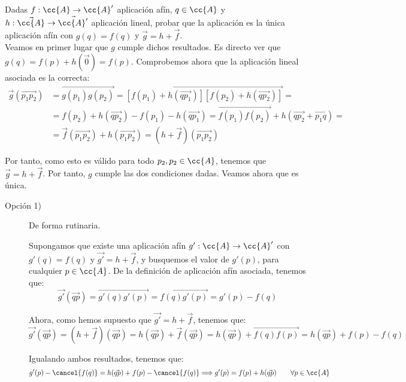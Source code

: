\begin{ejercicio}
    Dadas $f : \cc{A} \to \cc{A}'$ aplicación afín, $q \in \cc{A}$ y $h : \vec{\cc{A}} \to \vec{\cc{A}'}$ aplicación lineal, probar que la aplicación
    es la única aplicación afín con $g(q) = f(q)$ y $\vec{g} = h + \vec{f}$.\\

    Veamos en primer lugar que $g$ cumple dichos resultados. Es directo ver que $g(q)=f(p)+h(\vec{0}) = f(p)$. Comprobemos ahora que la aplicación lineal asociada es la correcta:
    \begin{equation*}\begin{split}
        \vec{g}(\vec{p_1p_2}) &= \vec{g(p_1)g(p_2)} = \vec{[f(p_1) + h(\vec{qp_1})][f(p_2) + h(\vec{qp_2})]} =\\&= f(p_2) + h(\vec{qp_2}) - f(p_1) - h(\vec{qp_1}) = \vec{f(p_1)f(p_2)} + h(\vec{qp_2}+\vec{p_1q}) =\\&= \vec{f}(\vec{p_1p_2}) + h(\vec{p_1p_2}) = (h+\vec{f})(\vec{p_1p_2})
    \end{split}\end{equation*}
    
    Por tanto, como esto es válido para todo $p_2,p_2\in \cc{A}$, tenemos que $\vec{g} = h + \vec{f}$. Por tanto, $g$ cumple las dos condiciones dadas. Veamos ahora que es única. 
    \begin{description}
        \item[Opción 1)] De forma rutinaria.

        Supongamos que existe una aplicación afín $g':\cc{A}\to \cc{A}'$ con $g'(q)=f(q)$ y $\vec{g'}=h+\vec{f}$, y busquemos el valor de $g'(p)$, para cualquier $p\in \cc{A}$. De la definición de aplicación afín asociada, tenemos que:
        \begin{equation*}
            \vec{g'}(\vec{qp}) = \vec{g'(q)g'(p)} = \vec{f(q)g'(p)} = g'(p) - f(q)
        \end{equation*}
    
        Ahora, como hemos supuesto que $\vec{g'}=h+\vec{f}$, tenemos que:
        \begin{equation*}
            \vec{g'}(\vec{qp}) = (h+\vec{f})(\vec{qp}) = h(\vec{qp}) + \vec{f}(\vec{qp}) = h(\vec{qp}) + \vec{f(q)f(p)} = h(\vec{qp}) + f(p) - f(q)
        \end{equation*}
    
        Igualando ambos resultados, tenemos que:
        \begin{equation*}
            g'(p) - \cancel{f(q)}=h(\vec{qp}) + f(p) - \cancel{f(q)} \Longrightarrow g'(p)=f(p)+h(\vec{qp}) \qquad \forall p\in \cc{A}
        \end{equation*}
    

\end{description}
\end{ejercicio}

